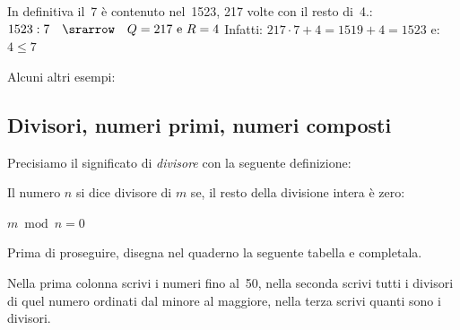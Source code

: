 In definitiva il~7 è contenuto nel~1523, 217 volte con il resto di~4.:\\
\(1523:7 \quad \srarrow \quad Q=217 \text{ e } R=4\) \quad
Infatti: \(217 \cdot 7 + 4 = 1519 + 4 = 1523\)
e: \(4 \leqslant 7\)

\vspace{.5em}
Alcuni altri esempi:

\vspace{-6pt}
\begin{center}
\begin{inaccessibleblock}
 
\end{inaccessibleblock}
\end{center}
\vspace{-12pt}


\subsection{Divisori, numeri primi, numeri composti}

Precisiamo il significato di \emph{divisore} con la seguente definizione:

\begin{definizione}
Il numero \(n\) si dice divisore di \(m\) se, il resto della divisione 
intera è zero: 
\begin{center} \(m \bmod n = 0\) \end{center}
\end{definizione}

Prima di proseguire, disegna nel quaderno la seguente tabella e completala. 
 
Nella prima colonna scrivi i numeri fino al~50, nella seconda scrivi tutti 
i divisori di quel numero ordinati dal minore al maggiore, nella terza 
scrivi quanti sono i divisori.

